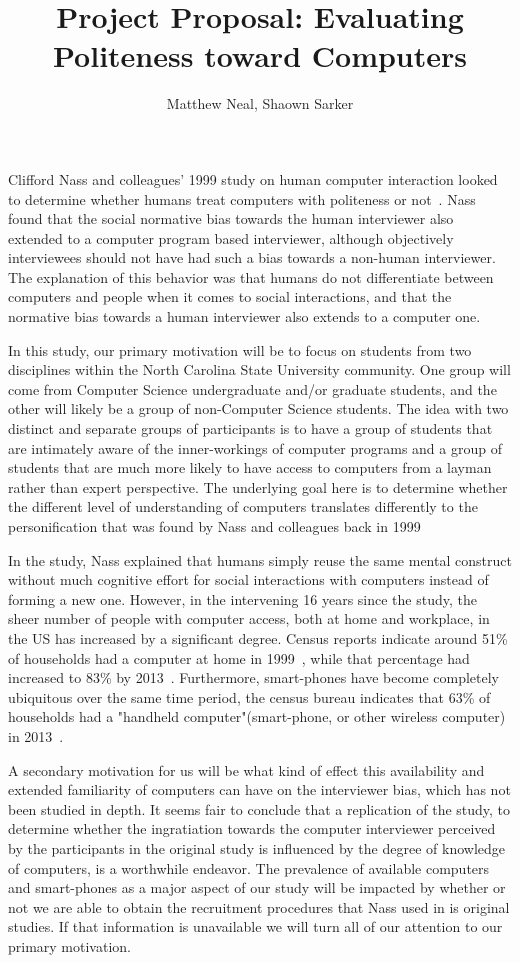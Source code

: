 \documentclass[english]{article}
\begin{document}
\title{Project Proposal: Evaluating Politeness toward Computers}
\author{Matthew Neal, Shaown Sarker}
\maketitle

Clifford Nass and colleagues' 1999 study on human computer interaction looked to determine whether humans treat computers with politeness or not~\cite{nass1999}. Nass found that the social normative bias towards the human interviewer also extended to a computer program based interviewer, although objectively interviewees should not have had such a bias towards a non-human interviewer. The explanation of this behavior was that humans do not differentiate between computers and people when it comes to social interactions, and that the normative bias towards a human interviewer also extends to a computer one.

In this study, our primary motivation will be to focus on students from two disciplines within the North Carolina State University community. One group will come from Computer Science undergraduate and/or graduate students, and the other will likely be a group of non-Computer Science students. The idea with two distinct and separate groups of participants is to have a group of students that are intimately aware of the inner-workings of computer programs and a group of students that are much more likely to have access to computers from a layman rather than expert perspective. The underlying goal here is to determine whether the different level of understanding of computers translates differently to the personification that was found by Nass and colleagues back in 1999

In the study, Nass explained that humans simply reuse the same mental construct without much cognitive effort for social interactions with computers instead of forming a new one. However, in the intervening 16 years since the study, the sheer number of people with computer access, both at home and workplace, in the US has increased by a significant degree. Census reports indicate around 51\% of households had a computer at home in 1999~\cite{newburger2001}, while that percentage had increased to 83\% by 2013~\cite{file2014}. Furthermore, smart-phones have become completely ubiquitous over the same time period, the census bureau indicates that 63\% of households had a "handheld computer"(smart-phone, or other wireless computer) in 2013~\cite{file2014}. 

A secondary motivation for us will be what kind of effect this availability and extended familiarity of computers can have on the interviewer bias, which has not been studied in depth. It seems fair to conclude that a replication of the study, to determine whether the ingratiation towards the computer interviewer perceived by the participants in the original study is influenced by the degree of knowledge of computers, is a worthwhile endeavor.  The prevalence of available computers and smart-phones as a major aspect of our study will be impacted by whether or not we are able to obtain the recruitment procedures that Nass used in is original studies.  If that information is unavailable we will turn all of our attention to our primary motivation.
\end{document}
